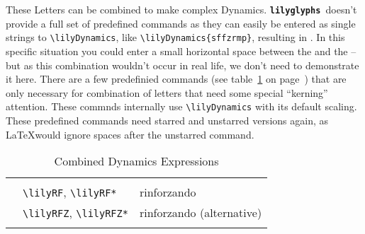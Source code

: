 \documentclass{article}
\newcommand{\lilyglyphs}{\texttt{\textbf{lilyglyphs\,}}}
\newcommand*{\cmd}[1]{\texttt{\textbackslash #1}}
\newcommand{\tmpCaption}{} %
\newcommand{\tmpLabel}{}
\newenvironment{reftable}[2]
	{%
		\renewcommand{\tmpCaption}{#1}
		\renewcommand{\tmpLabel}{#2}
		\begin{table}[ht]
		\begin{center}
		\begin{tabular}[t]{lll}
		\hline
		&\\
	}
	{%
		&\\
		\hline
		\end{tabular}
		\caption{\tmpCaption}
		\label{table:\tmpLabel}
		\end{center}
		\end{table}
	}
\begin{document}
These Letters can be combined to make complex Dynamics. \lilyglyphs doesn't provide a full set of predefined commands as they can easily be entered as single strings to \cmd{lilyDynamics}, like \cmd{lilyDynamics\{sffzrmp\}}, resulting in . In this specific situation you could enter a small horizontal space between the  and the  -- but as this combination wouldn't occur in real life, we don't need to demonstrate it here.
There are a few predefinied commands (see table~\ref{table:combinedDynLetters} on page~\pageref{table:combinedDynLetters}) that are only necessary for combination of letters that need some special \enquote{kerning} attention. These commnds internally use \cmd{lilyDynamics} with its default scaling. These predefined commands need starred and unstarred versions again, as \LaTeX would ignore spaces after the unstarred command.

\begin{reftable}{Combined Dynamics Expressions}{combinedDynLetters}
\lilyRF* & \cmd{lilyRF}, \cmd{lilyRF*} & rinforzando\\
\lilyRFZ* & \cmd{lilyRFZ}, \cmd{lilyRFZ*} & rinforzando (alternative)\\

\end{reftable}
\end{document}
